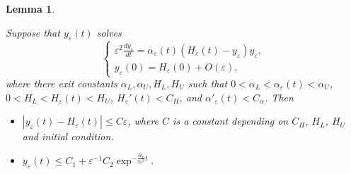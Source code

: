 \documentclass[10pt,a4paper]{amsart}
\newtheorem{lemma}{Lemma}
\begin{document}
\begin{lemma}\label{lma:KPPBound}

Suppose that $y_\varepsilon(t)$ solves 
\begin{equation}\label{eqn:GenKPP}
    \begin{cases}
\varepsilon^2\frac{dy_\varepsilon}{dt}=\alpha_\varepsilon(t)(H_\varepsilon(t)-y_\varepsilon)y_\varepsilon,\\
y_\varepsilon(0)=H_\varepsilon(0)+O(\varepsilon),
\end{cases}
\end{equation}
where there exit constants $\alpha_L,\alpha_U,H_L,H_U$ such that $0<\alpha_L<\alpha_\varepsilon(t)<\alpha_U$, $0<H_L<H_\varepsilon(t)<H_U$, $H_\varepsilon'(t)<C_H$, and $\alpha'_\varepsilon(t)<C_\alpha$. Then 
\begin{itemize}
    \item[(a)] $|y_\varepsilon(t)-H_\varepsilon(t)|\leq{}C\varepsilon$, where $C$ is a constant depending on $C_H$, $H_L$, $H_U$ and initial condition.
    \item[(b)] $\dot{y}_\varepsilon(t)\leq{}C_1+\varepsilon^{-1}C_2\exp^{-\frac{H_L}{2\varepsilon^2}t}.$
\end{itemize}
\end{lemma}
\end{document}
